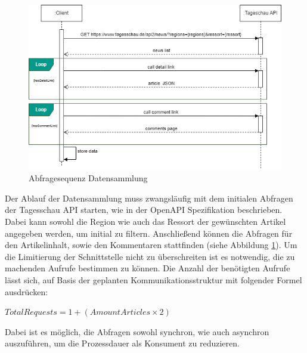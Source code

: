 \newpage

\begin{figure}
    \centering
    \includegraphics[width=1\linewidth]{abbildungen/Request Sequence.drawio.png}
    \caption{Abfragesequenz Datensammlung}
    \label{fig:Abfragesequenz Datensammlung}
\end{figure}
Der Ablauf der Datensammlung muss zwangsläufig mit dem initialen Abfragen der Tagesschau API starten, wie in der OpenAPI Spezifikation beschrieben. Dabei kann sowohl die Region wie auch das Ressort der gewünschten Artikel angegeben werden, um initial zu filtern. Anschließend können die Abfragen für den Artikelinhalt, sowie den Kommentaren stattfinden (siehe Abbildung \ref{fig:Abfragesequenz Datensammlung}). 
Um die Limitierung der Schnittstelle nicht zu überschreiten ist es notwendig, die zu machenden Aufrufe bestimmen zu können. Die Anzahl der benötigten Aufrufe lässt sich, auf Basis der geplanten Kommunikationsstruktur mit folgender Formel ausdrücken:

\(TotalRequests=1+(AmountArticles×2)\)

Dabei ist es möglich, die Abfragen sowohl synchron, wie auch asynchron auszuführen, um die Prozessdauer als Konsument zu reduzieren.

